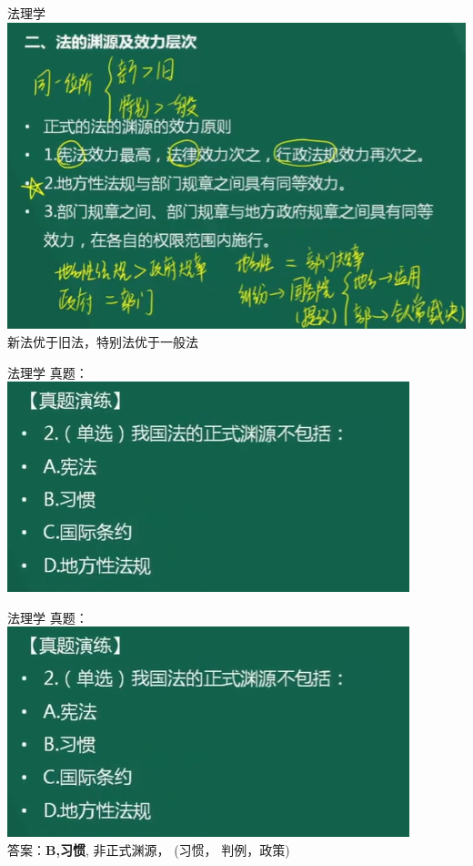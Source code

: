 \documentclass[aspectratio=169]{beamer}
\begin{document}
\begin{frame}[t]{法理学}
    \includegraphics[scale=0.5]{law_priority}\\ 
    新法优于旧法，特别法优于一般法\\
\end{frame}

\begin{frame}[t]{法理学}
    真题：\\
    \includegraphics[scale=0.5]{002}\\ 
\end{frame}


\begin{frame}[t]{法理学}
    真题：\\
    \includegraphics[scale=0.5]{002}\\ 
    答案：\textbf{B,习惯}, 非正式渊源， (习惯， 判例，政策)\\
\end{frame}
\end{document}
